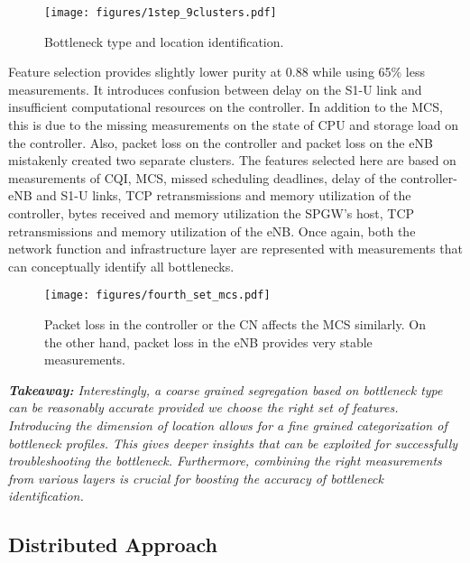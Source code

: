 \documentclass[journal,comsoc]{IEEEtran}
\begin{document}
%
\begin{figure}[t]
	\centering
	\texttt{[image: figures/1step\_9clusters.pdf]}
	\vspace{-8mm}
	\caption{Bottleneck type and location identification.}
	\vspace{-4mm}
	\label{fig:1step_9clusters}
\end{figure}

%
Feature selection provides slightly lower purity at 0.88  while using 65\% less measurements. It introduces confusion between delay on the S1-U link and insufficient computational resources on the controller. 
In addition to the MCS, this is due to the missing measurements on the state of CPU and storage load on the controller. 
Also, packet loss on the controller and packet loss on the eNB mistakenly created two separate clusters.
The features selected here are based on measurements of CQI, MCS, missed scheduling deadlines, delay of the controller-eNB and S1-U links, TCP retransmissions and memory utilization of the controller, bytes received and memory utilization the SPGW's host, TCP retransmissions and memory utilization of the eNB. 
Once again, both the network function and infrastructure layer are represented with measurements that can conceptually identify all bottlenecks.



% 
\begin{figure}[t]
	\centering
	\texttt{[image: figures/fourth\_set\_mcs.pdf]}
	\vspace{-8mm}
	\caption{Packet loss in the controller or the CN affects the MCS similarly. On the other hand, packet loss in the eNB provides very stable measurements.}
	\vspace{-4mm}
	\label{fig:fourth_set_mcs}
\end{figure}

%
{\em \textbf{Takeaway:} Interestingly, a coarse grained segregation based on bottleneck type can be reasonably accurate provided we choose the right set of features.
Introducing the dimension of location allows for a fine grained categorization of bottleneck profiles. 
This gives deeper insights that can be exploited for successfully troubleshooting the bottleneck. Furthermore, combining the right measurements from various layers is crucial for boosting the accuracy of bottleneck identification.}

%
\subsection{Distributed Approach}
\label{sec:bottlenecks_2step}
\end{document}
